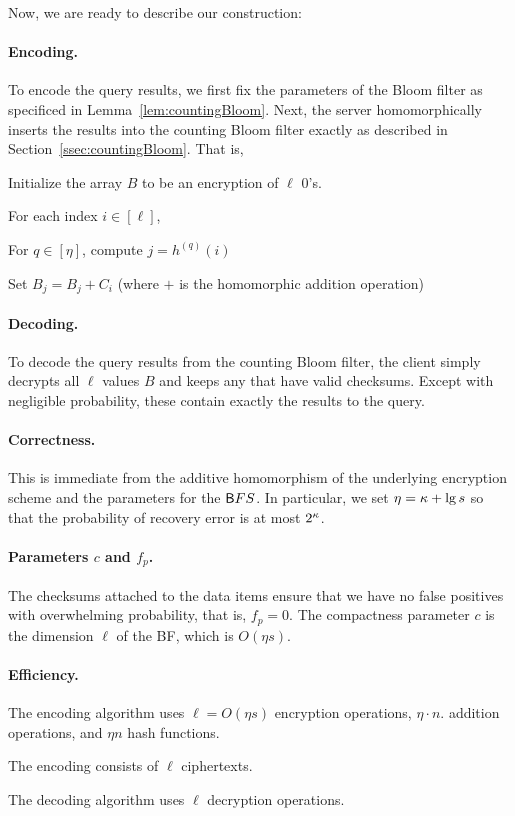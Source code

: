 Now, we are ready to describe our construction:

\paragraph{Encoding.}
To encode the query results, we first fix the parameters of the Bloom filter as specificed in Lemma~\ref{lem:countingBloom}.  Next, the server homomorphically inserts the results into the counting Bloom filter exactly as described in Section~\ref{ssec:countingBloom}.  That is,
\BI
    \item Initialize the array $B$ to be an encryption of $\ell$ 0's.
    \item 
    For each index $i \in [\ell]$,
    \BI
        \item For $q \in [\eta]$, compute $j =h^{(q)}(i)$
        \item Set $B_j = B_j + C_i$ (where $+$ is the homomorphic addition operation)
    \EI
\EI


\paragraph{Decoding.}
To decode the query results from the counting Bloom filter, the client simply decrypts all $\ell$ values $B$ and keeps any that have valid checksums.  Except with negligible probability, these contain exactly the results to the query.
\fi

\paragraph{Correctness.} This is immediate from the additive
homomorphism of the underlying encryption scheme and the parameters for
the $\sf BFS$. In particular, we set $\eta = \secparam+\lg{s}$ so that the
probability of recovery error is at most $2^\secparam$. 

\paragraph{Parameters $c$ and $f_p$.}
The checksums attached to the data items ensure that we have no false
positives with overwhelming probability, that is, $f_p = 0$. The compactness
parameter $c$ is the dimension $\ell$ of the BF, which is $O(\eta s)$. 

\paragraph{Efficiency.}
\BI
\item The encoding algorithm uses $\ell = O(\eta s)$ encryption
operations, $\eta \cdot n$. 
addition operations, and $\eta n$ hash functions. 
\item The encoding consists of $\ell$ ciphertexts. 
\item The decoding algorithm uses $\ell$ decryption operations.
\EI

